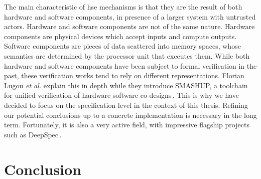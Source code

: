 The main characteristic of \ac{hse} mechanisms is that they are the result of
both hardware and software components, in presence of a larger system with
untrusted actors.
%
Hardware and software components are not of the same nature.
%
Hardware components are physical devices which accept inputs and compute
outputs.
%
Software components are pieces of data scattered into memory spaces, whose
semantics are determined by the processor unit that executes them.
%
While both hardware and software components have been subject to formal
verification in the past, these verification works tend to rely on different
representations.
%
Florian Lugou \emph{et al.} explain this in depth while they introduce SMASHUP,
a toolchain for unified verification of hardware-software
co-designs\,\cite{lugou2017smashup}.
%
This is why we have decided to focus on the specification level in the context
of this thesis.
%
Refining our potential conclusions up to a concrete implementation is necessary
in the long term.
%
Fortunately, it is also a very active field, with impressive flagship projects
such as DeepSpec\,\cite{appel2017deepspec}.

\section{Conclusion}